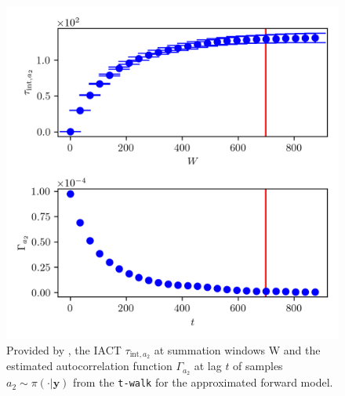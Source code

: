 \begin{figure}[ht!]
	\centering
	\includegraphics{UwerrTauIntTWalk10.png}
	\caption[IACT and autocorrelation function of samples $a_2 \sim \pi(\cdot|\bm{y})$, for approximated model.]{Provided by \cite{drikHesse}, the IACT $\tau_{\text{int},a_2}$ at summation windows W and the estimated autocorrelation function $\Gamma_{a_2}$ at lag $t$ of samples $a_2 \sim \pi( \cdot | \bm{y})$ from the \texttt{t-walk} for the approximated forward model.}
	\label{fig:TWalkIATC11}
\end{figure}


